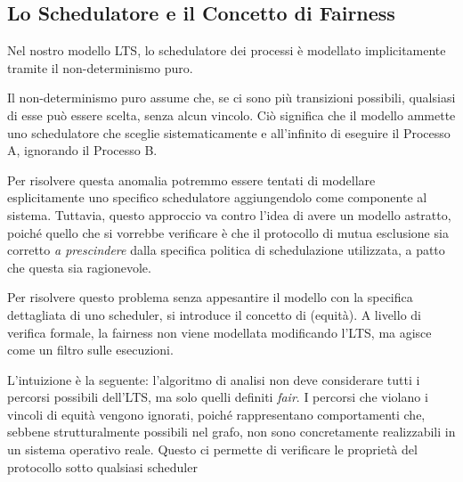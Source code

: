 \subsection{Lo Schedulatore e il Concetto di Fairness}

Nel nostro modello LTS, lo schedulatore dei processi è modellato implicitamente tramite il non-determinismo puro.

Il non-determinismo puro assume che, se ci sono più transizioni possibili, qualsiasi di esse può essere scelta, senza alcun vincolo. Ciò significa che il modello ammette uno schedulatore  che sceglie sistematicamente e all'infinito di eseguire il Processo A, ignorando il Processo B.

Per risolvere questa anomalia potremmo essere tentati di modellare esplicitamente uno specifico schedulatore aggiungendolo come componente al sistema. Tuttavia, questo approccio va contro l'idea di avere un modello astratto, poiché quello che si vorrebbe verificare è che il protocollo di mutua esclusione sia corretto \textit{a prescindere} dalla specifica politica di schedulazione utilizzata, a patto che questa sia ragionevole.

Per risolvere questo problema senza appesantire il modello con la specifica dettagliata di uno scheduler, si introduce il concetto di  (equità). A livello di verifica formale, la fairness non viene modellata modificando l'LTS, ma agisce come un filtro sulle esecuzioni.

L'intuizione è la seguente: l'algoritmo di analisi non deve considerare tutti i percorsi possibili dell'LTS, ma solo quelli definiti \textit{fair}. I percorsi che violano i vincoli di equità vengono ignorati, poiché rappresentano comportamenti che, sebbene strutturalmente possibili nel grafo, non sono concretamente realizzabili in un sistema operativo reale. Questo ci permette di verificare le proprietà del protocollo sotto qualsiasi scheduler 

